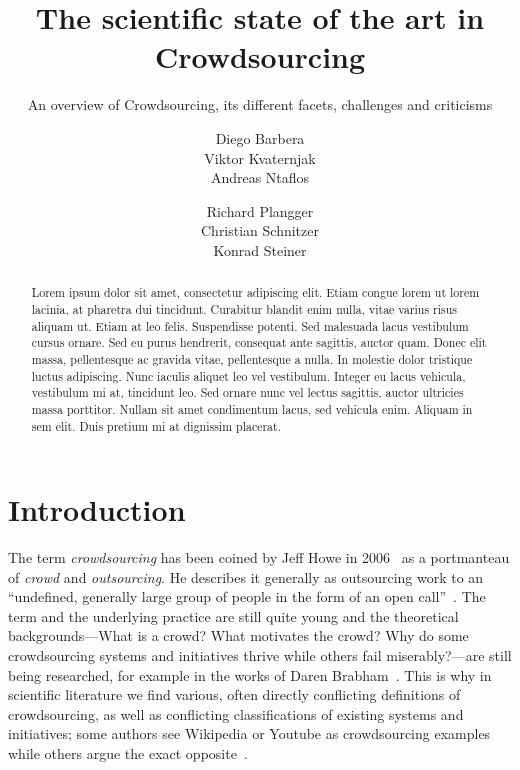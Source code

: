 \documentclass{sig-alternate}
\begin{document}
\title{The scientific state of the art in Crowdsourcing}
\subtitle{An overview of Crowdsourcing, its different facets, challenges and criticisms}


\author{%
	\alignauthor
	Diego Barbera\\ 
%
	\alignauthor
	Viktor Kvaternjak\\
%
	\alignauthor
	Andreas Ntaflos\\
%
	\and
%
	\alignauthor
	Richard Plangger\\ 
%
	\alignauthor
	Christian Schnitzer\\ 
%
	\alignauthor
	Konrad Steiner\\ 
	\and
}

\maketitle

\begin{abstract}
	Lorem ipsum dolor sit amet, consectetur adipiscing elit. Etiam congue
	lorem ut lorem lacinia, at pharetra dui tincidunt. Curabitur blandit enim
	nulla, vitae varius risus aliquam ut. Etiam at leo felis. Suspendisse
	potenti. Sed malesuada lacus vestibulum cursus ornare. Sed eu purus
	hendrerit, consequat ante sagittis, auctor quam. Donec elit massa,
	pellentesque ac gravida vitae, pellentesque a nulla. In molestie dolor
	tristique luctus adipiscing. Nunc iaculis aliquet leo vel vestibulum.
	Integer eu lacus vehicula, vestibulum mi at, tincidunt leo. Sed ornare
	nunc vel lectus sagittis, auctor ultricies massa porttitor. Nullam sit
	amet condimentum lacus, sed vehicula enim. Aliquam in sem elit. Duis
	pretium mi at dignissim placerat.
\end{abstract}

\section{Introduction}

The term \emph{crowdsourcing} has been coined by Jeff Howe in
2006~\cite{howe2006rise} as a portmanteau of \emph{crowd} and
\emph{outsourcing}. He describes it generally as outsourcing work to an
``undefined, generally large group of people in the form of an open
call''~\cite{howe2009crowdsourcing}. The term and the underlying practice are
still quite young and the theoretical backgrounds---What is a crowd? What
motivates the crowd? Why do some crowdsourcing systems and initiatives thrive
while others fail miserably?---are still being researched, for example in the
works of Daren Brabham~\cite{brabham2008crowdsourcing, brabham2008moving,
	brabham2010moving}. This is why in scientific literature we find various,
often directly conflicting definitions of crowdsourcing, as well as conflicting
classifications of existing systems and initiatives; some authors see Wikipedia
or Youtube as crowdsourcing examples while others argue the exact
opposite~\cite{estelles2012towards}.
\end{document}
